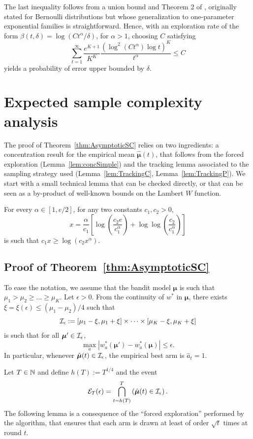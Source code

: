 \documentclass{colt2016} %
\begin{document}
The last inequality follows from a union bound and Theorem 2 of \cite{Combes14Lip}, originally stated for Bernoulli distributions but whose generalization to one-parameter exponential families is straightforward. Hence, with an exploration rate of the form $\beta(t,\delta)=\log(C t^\alpha / \delta)$, for $\alpha >1$, choosing $C$ satisfying
\[\sum_{t=1}^\infty \frac{e^{K+1}}{K^K} \frac{(\log^2(Ct^\alpha) \log t)^K}{t^\alpha} \leq C\]
yields a probability of error upper bounded by $\delta$. 



\section{Expected sample complexity analysis}\label{sec:ProofSC}

The proof of Theorem~\ref{thm:AsymptoticSC} relies on two ingredients: a concentration result for the empirical mean $\hat{\bm\mu}(t)$, that follows from the forced exploration (Lemma~\ref{lem:concSimple}) and the tracking lemma associated to the sampling strategy used (Lemma~\ref{lem:TrackingC}, Lemma~\ref{lem:TrackingP}).  
We start with a small technical lemma that can be checked directly, or that can be seen as a by-product of well-known bounds on the Lambert $W$ function.
\begin{lemma}\label{lem:technical} For every $\alpha \in [1,e/2]$, for any two constants $c_1,c_2>0$, 
\[x = \frac{\alpha}{c_1}\left[\log\left(\frac{c_2 e}{c_1^\alpha}\right) + \log\log\left(\frac{c_2}{c_1^\alpha}\right)\right]\]
is such that $c_1  x \geq \log(c_2 x^\alpha)$. 
\end{lemma}
\subsection{Proof of Theorem~\ref{thm:AsymptoticSC}}

To ease the notation, we assume that the bandit model $\bm \mu$ is such that $\mu_1 > \mu_2 \geq \dots \geq \mu_K$.
Let $\epsilon>0$. From the continuity of $w^*$ in $\bm \mu$, there exists $\xi=\xi(\epsilon) \leq (\mu_1-\mu_2)/4$ such that 
\[\mathcal{I}_\epsilon := [\mu_1 - \xi,\mu_1 + \xi] \times \dots \times [\mu_K - \xi, \mu_K + \xi]\]
is such that for all $\bm\mu' \in \mathcal{I}_\epsilon$, \[\max_a |w_a^*(\bm\mu') - w^*_a(\bm\mu)| \leq \epsilon.\] In particular, whenever $\hat{\bm \mu}(t) \in \mathcal{I}_\epsilon$, the empirical best arm is $\hat{a}_t =1$.


Let $T \in \mathbb{N}$ and define $h(T):=T^{1/4}$ and the event 
\[\mathcal{E}_T(\epsilon)= \bigcap_{t = h(T)}^{T}\left(\hat{\bm \mu}(t) \in \mathcal{I}_\epsilon \right).\]
The following lemma is a consequence of the ``forced exploration'' performed by the algorithm, that ensures that each arm is drawn at least of order $\sqrt{t}$ times at round $t$. 
\end{document}
